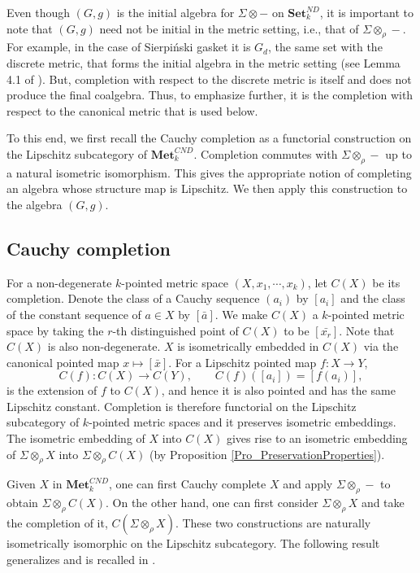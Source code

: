 \documentclass{sn-jnl}%
\theoremstyle{thmstyleone}%
\theoremstyle{thmstyletwo}%
\theoremstyle{thmstylethree}%
\newcommand{\setnd}{\mathbf{Set}_{k}^{ND}}
\newcommand{\mcnd}{\mathbf{Met}_{k}^{CND}}
\newcommand{\M}{\Sigma}
\newcommand{\F}{\M\otimes}
\newcommand{\Fw}{\M\otimes_{\w}}
\newcommand{\X}{\left(X, x_1 ,\cdots , x_k\right)}
\newcommand{\w}{\rho}
\begin{document}
Even though $(G, g)$ is the initial algebra for $\F -$ on $\setnd$, it is important to note that $(G,g)$ need not be initial in the metric setting, i.e., that of $\Fw -$. For example, in the case of Sierpiński  gasket it is $G_d$, the same set with the discrete metric, that forms the initial algebra in the metric setting (see Lemma 4.1 of \cite{Sierpinski_gasket}). But, completion with respect to the discrete metric is itself and does not produce the final coalgebra. Thus, to  emphasize further, it is the completion with respect to the canonical metric that is used below. 

To this end, we first recall the Cauchy completion as a  functorial construction on the Lipschitz subcategory of $\mcnd$. Completion commutes with $\Fw -$ up to a natural isometric isomorphism. This gives the appropriate notion of completing an algebra whose structure map is Lipschitz.  We then apply this construction to the algebra $(G,g)$.

\subsection{Cauchy completion}
For a non-degenerate $k$-pointed metric space $\X$, let $C(X)$ be its completion. Denote the class of a Cauchy sequence $(a_i)$  by $[a_i]$ and the class of the constant sequence  of $a\in X$ by $[\bar{a}]$. We make $C(X)$ a $k$-pointed metric space by taking the $r$-th distinguished point of $C(X)$ to be $[\bar{x_r}]$. Note that $C(X)$ is also non-degenerate. $X$ is isometrically embedded in $C(X)$ via the canonical pointed map $x \mapsto [\bar{x}]$.  
For a Lipschitz pointed map $f:X\to Y$,
\begin{equation} \nonumber
    C(f):C(X)\longrightarrow C(Y),\qquad C(f)([a_i])=[f(a_i)],
\end{equation}
is the extension of $f$ to $C(X)$, and hence it is also pointed and has the same Lipschitz constant. Completion is therefore functorial on the Lipschitz subcategory of $k$-pointed metric spaces and it preserves isometric embeddings. The isometric embedding of $X$ into $C(X)$ gives rise to an isometric embedding of $\Fw X$ into $\Fw C(X)$ (by Proposition \ref{Pro_PreservationProperties}).  

Given $X$ in $\mcnd$, one can first Cauchy complete $X$ and apply $\Fw -$ to obtain $\Fw C(X)$. On the other hand, one can first consider $\Fw X$ and take the completion of it, $C(\Fw X)$. These two constructions are naturally isometrically isomorphic on the Lipschitz subcategory. The following result generalizes \cite[Lemma~13]{Bhat} and is recalled  in \cite[Proposition~3.5]{Sierpinski_gasket}.
\end{document}
